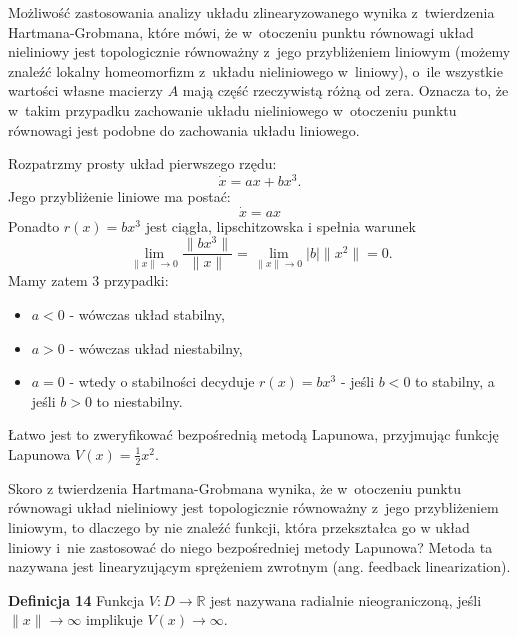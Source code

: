 \documentclass{article}
\begin{document}
\begin{tcolorbox}[colback=orange!5, colframe=orange!75!black, title=Uwaga]
Możliwość zastosowania analizy układu zlinearyzowanego wynika z~twierdzenia
Hartmana-Grobmana, które mówi, że w~otoczeniu punktu równowagi układ nieliniowy
jest topologicznie równoważny z~jego przybliżeniem liniowym (możemy znaleźć lokalny
homeomorfizm z~układu nieliniowego w~liniowy), o~ile wszystkie
wartości własne macierzy $A$ mają część rzeczywistą różną od zera.
Oznacza to, że w~takim przypadku zachowanie układu nieliniowego w~otoczeniu
punktu równowagi jest podobne do zachowania układu liniowego. 
\end{tcolorbox}

\begin{tcolorbox}[colback=green!5, colframe=green!75!black, title=Przykład]
Rozpatrzmy prosty układ pierwszego rzędu:
$$
    \dot{x} = ax + bx^3.
$$
Jego przybliżenie liniowe ma postać:
$$
    \dot{x} = ax
$$
Ponadto $r(x) = bx^3$ jest ciągła, lipschitzowska i spełnia warunek
$$
    \lim_{\lVert x \rVert \rightarrow 0} \frac{\lVert bx^3 \rVert}{\lVert x \rVert} = \lim_{\lVert x \rVert \rightarrow 0} |b| \lVert x^2 \rVert = 0.
$$
Mamy zatem 3 przypadki:
\begin{itemize}
    \item $a<0$ - wówczas układ stabilny,
    \item $a>0$ - wówczas układ niestabilny,
    \item $a=0$ - wtedy o stabilności decyduje $r(x) = bx^3$ - jeśli $b<0$ to stabilny, a jeśli $b>0$ to niestabilny.
\end{itemize}
Łatwo jest to zweryfikować bezpośrednią metodą Lapunowa, przyjmując funkcję Lapunowa $V(x) = \frac{1}{2}x^{2}$.
\end{tcolorbox}

\begin{tcolorbox}[colback=orange!5, colframe=orange!75!black, title=Uwaga]
    Skoro z twierdzenia Hartmana-Grobmana wynika, że w~otoczeniu punktu
    równowagi układ nieliniowy jest topologicznie równoważny z~jego
    przybliżeniem liniowym, to dlaczego by nie znaleźć funkcji, która
    przekształca go w układ liniowy i~nie zastosować do niego bezpośredniej
    metody Lapunowa?
    Metoda ta nazywana jest linearyzującym sprężeniem zwrotnym (ang. feedback
    linearization).
\end{tcolorbox}

\textbf{Definicja 14}
Funkcja $V:D\rightarrow\mathbb{R}$ jest nazywana radialnie nieograniczoną, jeśli $\lVert x \rVert \rightarrow \infty$ implikuje $V(x) \rightarrow \infty$.
\end{document}
